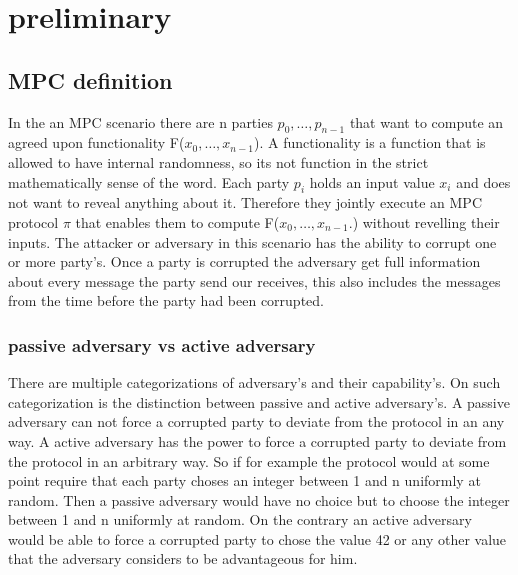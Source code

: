 \chapter{preliminary}
\section{MPC definition}
In the an MPC scenario there are n parties $ p_0,\dots,p_{n-1} $ that want to compute an agreed upon functionality F($ x_0,\dots,x_{n-1} $). A functionality is a function that is allowed to have internal randomness, so its not function in the strict mathematically sense of the word. 
 Each party $ p_i $ holds an input value $ x_i $  and does not want to reveal anything about it.
Therefore they jointly execute an MPC protocol $ \pi $ that enables them to compute F($ x_0,\dots,x_{n-1}. $) without revelling their inputs. The attacker or adversary in this scenario has the ability to corrupt one or more party's. Once a party is corrupted the adversary get full information about every message the party send our receives, this also includes the messages from the time before the party had been corrupted.  


\subsection{passive adversary vs active adversary}
There are multiple categorizations of adversary's  and their capability's. On such categorization is the distinction between passive and active adversary's. A passive adversary can not force a corrupted party to deviate from the protocol in an any way. A active adversary has the power to force a corrupted party to deviate from the protocol in an arbitrary way. So if for example the protocol would at some point require that each party choses an integer between 1 and n uniformly at random.  Then a passive adversary would have no choice but to choose the integer between 1 and n uniformly at random. On the contrary an active adversary would be able to force a corrupted party to chose the value 42 or any other value that the adversary considers to be advantageous for him.


